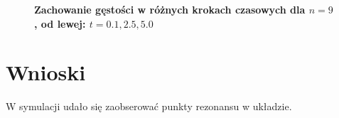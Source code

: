 \documentclass[11pt,a4paper]{article}
\begin{document}
\begin{figure}[ht!]
\begin{multicols}{3}
    \end{multicols}
    \caption{\textbf{Zachowanie gęstości w różnych krokach czasowych dla $n=9$, od lewej: $t=0.1,2.5,5.0$}}
\end{figure}

\section{Wnioski}

W symulacji udało się zaobserować punkty rezonansu w układzie.
\end{document}
